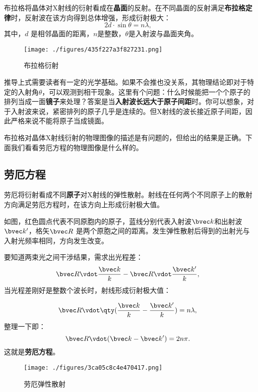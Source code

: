布拉格将晶体对X射线的衍射看成在\textbf{晶面}的反射。在不同晶面的反射满足\textbf{布拉格定律}时，反射波在该方向得到总体增强，形成衍射极大：
\begin{equation}\label{eq_RecLat_1}
2d \cdot \sin\theta = n\lambda,~
\end{equation}
其中，$d$ 是相邻晶面的距离，$n$是整数，$\theta$是入射波与晶面夹角。
\begin{figure}[ht]
\centering
\texttt{[image: ./figures/435f227a3f827231.png]}
\caption{布拉格衍射} \label{fig_RecLat_2}
\end{figure}
推导上式需要读者有一定的光学基础。如果不会推也没关系，其物理结论即对于特定的入射角$\theta$，可以观测到相干现象。这里有个问题：什么时候能把一个个原子的排列当成一面\textbf{镜子}来处理？答案是当\textbf{入射波长远大于原子间距}时。你可以想象，对于入射波来说，紧密排列的原子几乎是连续的。但X射线的波长接近原子间距，因此严格来说不能将原子当成镜面。

布拉格对晶体X射线衍射的物理图像的描述是有问题的，但给出的结果是正确。下面我们看看劳厄方程的物理图像是什么样的。

\subsection{劳厄方程}
劳厄将衍射看成不同\textbf{原子}对X射线的弹性散射。射线在任何两个不同原子上的散射方向满足劳厄方程时，在该方向上形成衍射极大值。

如图，红色圆点代表不同原胞内的原子，蓝线分别代表入射波$\bvec k$和出射波$\bvec k'$，格矢$\bvec R$ 是两个原胞之间的距离。发生弹性散射后得到的出射光与入射光频率相同，方向发生改变。

要知道两束光之间干涉结果，需求出光程差：
\begin{equation}
\bvec R \vdot \dfrac{\bvec k}{k} - \bvec R \vdot \dfrac{\bvec k'}{k} ,~
\end{equation}
当光程差刚好是整数个波长时，射线形成衍射极大值：

\begin{align}
\bvec R \vdot \qty( \dfrac{\bvec k}{k} - \dfrac{\bvec k'}{k} ) &= n\lambda ,~\\
\end{align}
整理一下即：
\begin{equation}
\bvec R \vdot( \bvec k - \bvec k') = 2n\pi.~
\end{equation}
这就是\textbf{劳厄方程}。


\begin{figure}[ht]
\centering
\texttt{[image: ./figures/3ca05c8c4e470417.png]}
\caption{劳厄弹性散射} \label{fig_RecLat_3}
\end{figure}
